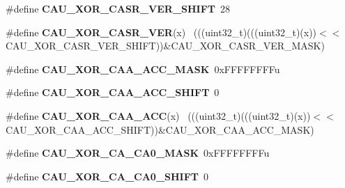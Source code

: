 \begin{DoxyCompactItemize}
\item 
\hypertarget{group___c_a_u___register___masks_ga935619a005c89a213ef4df90046e2802}{}\#define {\bfseries C\+A\+U\+\_\+\+X\+O\+R\+\_\+\+C\+A\+S\+R\+\_\+\+V\+E\+R\+\_\+\+S\+H\+I\+F\+T}~28\label{group___c_a_u___register___masks_ga935619a005c89a213ef4df90046e2802}

\item 
\hypertarget{group___c_a_u___register___masks_ga95c85bac25ac3696bcf691b6fcad94ee}{}\#define {\bfseries C\+A\+U\+\_\+\+X\+O\+R\+\_\+\+C\+A\+S\+R\+\_\+\+V\+E\+R}(x)                                        ~(((uint32\+\_\+t)(((uint32\+\_\+t)(x))$<$$<$C\+A\+U\+\_\+\+X\+O\+R\+\_\+\+C\+A\+S\+R\+\_\+\+V\+E\+R\+\_\+\+S\+H\+I\+F\+T))\&C\+A\+U\+\_\+\+X\+O\+R\+\_\+\+C\+A\+S\+R\+\_\+\+V\+E\+R\+\_\+\+M\+A\+S\+K)\label{group___c_a_u___register___masks_ga95c85bac25ac3696bcf691b6fcad94ee}

\item 
\hypertarget{group___c_a_u___register___masks_gad749b4e76ae58d704efbe7be8c9fd935}{}\#define {\bfseries C\+A\+U\+\_\+\+X\+O\+R\+\_\+\+C\+A\+A\+\_\+\+A\+C\+C\+\_\+\+M\+A\+S\+K}~0x\+F\+F\+F\+F\+F\+F\+F\+Fu\label{group___c_a_u___register___masks_gad749b4e76ae58d704efbe7be8c9fd935}

\item 
\hypertarget{group___c_a_u___register___masks_gabce35c8c48d54d7175820c3a5f0b120c}{}\#define {\bfseries C\+A\+U\+\_\+\+X\+O\+R\+\_\+\+C\+A\+A\+\_\+\+A\+C\+C\+\_\+\+S\+H\+I\+F\+T}~0\label{group___c_a_u___register___masks_gabce35c8c48d54d7175820c3a5f0b120c}

\item 
\hypertarget{group___c_a_u___register___masks_ga8300f1b7421ef1179f00d92041ca1fb4}{}\#define {\bfseries C\+A\+U\+\_\+\+X\+O\+R\+\_\+\+C\+A\+A\+\_\+\+A\+C\+C}(x)                                          ~(((uint32\+\_\+t)(((uint32\+\_\+t)(x))$<$$<$C\+A\+U\+\_\+\+X\+O\+R\+\_\+\+C\+A\+A\+\_\+\+A\+C\+C\+\_\+\+S\+H\+I\+F\+T))\&C\+A\+U\+\_\+\+X\+O\+R\+\_\+\+C\+A\+A\+\_\+\+A\+C\+C\+\_\+\+M\+A\+S\+K)\label{group___c_a_u___register___masks_ga8300f1b7421ef1179f00d92041ca1fb4}

\item 
\hypertarget{group___c_a_u___register___masks_ga1b5b9a631549a09772404a13cc8bb2c6}{}\#define {\bfseries C\+A\+U\+\_\+\+X\+O\+R\+\_\+\+C\+A\+\_\+\+C\+A0\+\_\+\+M\+A\+S\+K}~0x\+F\+F\+F\+F\+F\+F\+F\+Fu\label{group___c_a_u___register___masks_ga1b5b9a631549a09772404a13cc8bb2c6}

\item 
\hypertarget{group___c_a_u___register___masks_ga668e19ef62b1ef693c25a076b8102ad1}{}\#define {\bfseries C\+A\+U\+\_\+\+X\+O\+R\+\_\+\+C\+A\+\_\+\+C\+A0\+\_\+\+S\+H\+I\+F\+T}~0\label{group___c_a_u___register___masks_ga668e19ef62b1ef693c25a076b8102ad1}


\end{DoxyCompactItemize}
